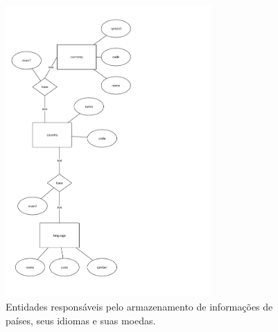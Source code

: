 \documentclass[12pt]{article}
\begin{document}
\begin{figure}[H]
\centering
\includegraphics[height=0.92\textheight,width=0.70\textwidth]{MER_-_Country-Language-Currency.pdf}
\caption{Entidades responsáveis pelo armazenamento de informações de países, seus idiomas e suas moedas.} \label{hash}
\end{figure}
\end{document}
